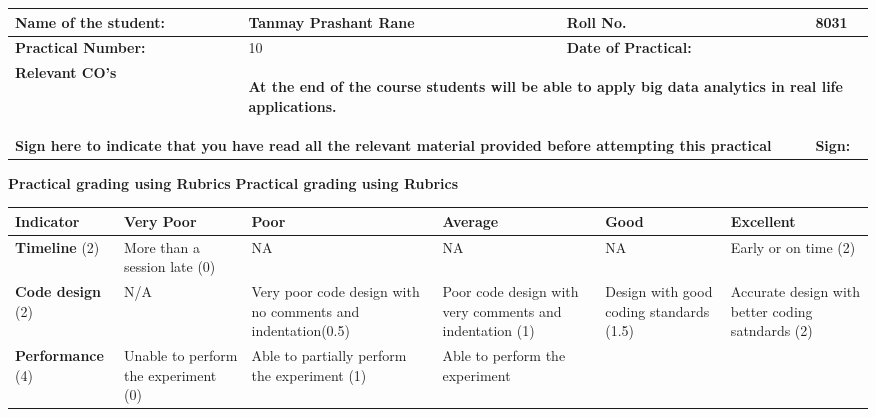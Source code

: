 \documentclass[11pt,article]{memoir}
\begin{document}
\sloppy
\fancypage{\doublebox}{}
\begin{flushleft}


    \begin{tabular}{ | p{4cm} | p{5cm} | p{3.5cm} | p{2cm} |}
    \hline

    \textbf{Name of the student:}& Tanmay Prashant Rane &\textbf{Roll No.} & 8031 \\ \hline
    \textbf{Practical Number:}& 10 & \textbf{Date of Practical:} & \\ \hline
	\textbf{Relevant CO's} & \multicolumn{3}{|p{10.5cm}|}{\begin{flushleft}
	\textbf{At the end of the course students will be able to apply big data analytics in real life applications.}
	\end{flushleft}}\\
    \hline
    \multicolumn{3}{|p{12.5cm}|}{\textbf{Sign here to indicate that you have read all the relevant material provided before attempting this practical}}& \textbf{Sign:}\\ \hline
    \end{tabular}
    \vspace{1cm}
        \textbf{Practical grading using Rubrics}
           \textbf{Practical grading using Rubrics}
                             \begin{tabular}{|p{2cm}|p{2cm}|p{2cm}|p{2cm}|p{2cm}|p{2cm}|}
                             \hline \textbf{Indicator} & \textbf{Very Poor} & \textbf{Poor} & \textbf{Average} & \textbf{Good} & \textbf{Excellent} \\ 
                             \hline \textbf{Timeline} (2) & More than a session late (0) & NA  & NA & NA  & Early or on time (2) \\ 
                             \hline \textbf{Code design} (2) & N/A & Very poor code design with no comments and indentation(0.5) & Poor code design with very comments and indentation
                             (1) & Design with good coding standards (1.5) & Accurate design with better coding satndards (2) \\ 
                             \hline \textbf{Performance} (4) & Unable to
                             perform the
                             experiment
                             (0) & Able to
                             partially
                             perform the
                             experiment
                             (1)
                              & Able to
                              perform the
                              experiment

\end{tabular}
\end{flushleft}
\end{document}
